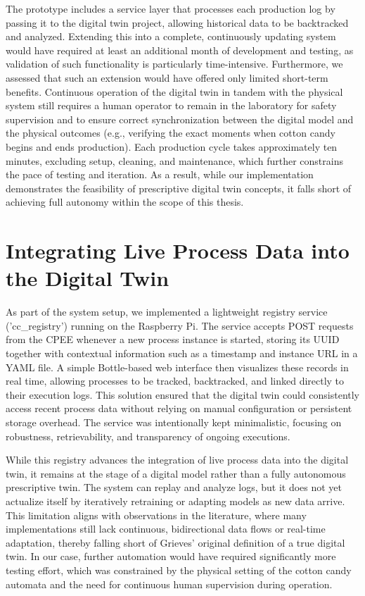 The prototype includes a service layer that processes each production log by passing it to the digital twin project, allowing historical data to be backtracked and analyzed. Extending this into a complete, continuously updating system would have required at least an additional month of development and testing, as validation of such functionality is particularly time-intensive. Furthermore, we assessed that such an extension would have offered only limited short-term benefits. Continuous operation of the digital twin in tandem with the physical system still requires a human operator to remain in the laboratory for safety supervision and to ensure correct synchronization between the digital model and the physical outcomes (e.g., verifying the exact moments when cotton candy begins and ends production). Each production cycle takes approximately ten minutes, excluding setup, cleaning, and maintenance, which further constrains the pace of testing and iteration. As a result, while our implementation demonstrates the feasibility of prescriptive digital twin concepts, it falls short of achieving full autonomy within the scope of this thesis.


\section{Integrating Live Process Data into the Digital Twin}
As part of the system setup, we implemented a lightweight registry service ('cc\_registry') running on the Raspberry Pi. The service accepts POST requests from the CPEE whenever a new process instance is started, storing its UUID together with contextual information such as a timestamp and instance URL in a YAML file. A simple Bottle-based web interface then visualizes these records in real time, allowing processes to be tracked, backtracked, and linked directly to their execution logs. This solution ensured that the digital twin could consistently access recent process data without relying on manual configuration or persistent storage overhead. The service was intentionally kept minimalistic, focusing on robustness, retrievability, and transparency of ongoing executions.

While this registry advances the integration of live process data into the digital twin, it remains at the stage of a digital model rather than a fully autonomous prescriptive twin. The system can replay and analyze logs, but it does not yet actualize itself by iteratively retraining or adapting models as new data arrive. This limitation aligns with observations in the literature, where many implementations still lack continuous, bidirectional data flows or real-time adaptation, thereby falling short of Grieves’ original definition of a true digital twin. In our case, further automation would have required significantly more testing effort, which was constrained by the physical setting of the cotton candy automata and the need for continuous human supervision during operation.


